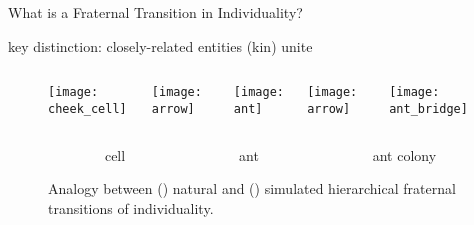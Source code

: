 \begin{frame}{What is a Fraternal Transition in Individuality?}

key distinction: closely-related entities (kin) unite

\pause

\vspace{2ex}

\begin{figure}
\begin{columns}
\begin{column}{0.27\textwidth}
\texttt{[image: cheek\_cell]}
\end{column}
\begin{column}{0.07\textwidth}
\texttt{[image: arrow]}
\end{column}
\begin{column}{0.27\textwidth}
\texttt{[image: ant]}
\end{column}
\begin{column}{0.07\textwidth}
\texttt{[image: arrow]}
\end{column}
\begin{column}{0.27\textwidth}
\texttt{[image: ant\_bridge]}
\end{column}
\end{columns}
\vspace{1ex}
\begin{columns}
\begin{column}{0.05\textwidth}
\end{column}
\begin{column}{0.27\textwidth}
\centering
cell {\tiny\cite{clare_and_ben_2017}}
\end{column}
\begin{column}{0.07\textwidth}
\end{column}
\begin{column}{0.27\textwidth}
\centering
ant {\tiny\cite{quinzani_2008}}
\end{column}
\begin{column}{0.07\textwidth}
\end{column}
\begin{column}{0.27\textwidth}
\centering
ant colony {\tiny\cite{gallice_2011}}
\end{column}
\end{columns}
\vspace{2ex}
\caption{Analogy between () natural and () simulated hierarchical fraternal transitions of individuality.}

\end{figure}


\end{frame}

